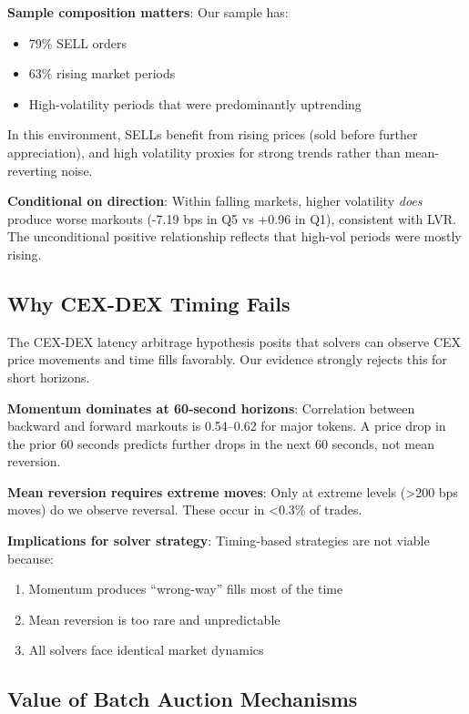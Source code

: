 \documentclass[12pt,a4paper]{article}
\begin{document}
\textbf{Sample composition matters}: Our sample has:
\begin{itemize}
    \item 79\% SELL orders
    \item 63\% rising market periods
    \item High-volatility periods that were predominantly uptrending
\end{itemize}

In this environment, SELLs benefit from rising prices (sold before further appreciation), and high volatility proxies for strong trends rather than mean-reverting noise.

\textbf{Conditional on direction}: Within falling markets, higher volatility \textit{does} produce worse markouts (-7.19 bps in Q5 vs +0.96 in Q1), consistent with LVR. The unconditional positive relationship reflects that high-vol periods were mostly rising.

\subsection{Why CEX-DEX Timing Fails}

The CEX-DEX latency arbitrage hypothesis \citep{cohen2012, bachu2024} posits that solvers can observe CEX price movements and time fills favorably. Our evidence strongly rejects this for short horizons.

\textbf{Momentum dominates at 60-second horizons}: Correlation between backward and forward markouts is 0.54--0.62 for major tokens. A price drop in the prior 60 seconds predicts further drops in the next 60 seconds, not mean reversion.

\textbf{Mean reversion requires extreme moves}: Only at extreme levels (>200 bps moves) do we observe reversal. These occur in <0.3\% of trades.

\textbf{Implications for solver strategy}: Timing-based strategies are not viable because:
\begin{enumerate}
    \item Momentum produces ``wrong-way'' fills most of the time
    \item Mean reversion is too rare and unpredictable
    \item All solvers face identical market dynamics
\end{enumerate}

\subsection{Value of Batch Auction Mechanisms}
\end{document}

